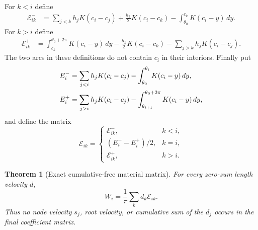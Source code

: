 \documentclass[11pt]{amsart}
\providecommand{\mathscr}{\mathcal}
\numberwithin{equation}{section}
\newtheorem{theorem}{Theorem}[section]
\theoremstyle{definition}
\theoremstyle{remark}
\providecommand{\mathscr}[1]{\mathcal{#1}}
\begin{document}
For $k<i$ define
\begin{align}
 \mathscr E_{ik}^-&=
 \sum_{j<k}h_jK(c_i-c_j)+\frac{h_k}{2}K(c_i-c_k)
 -\int_{\theta_0}^{c_k}K(c_i-y)\,dy. \label{F148:eq:Eminus}
\end{align}
For $k>i$ define
\begin{align}
 \mathscr E_{ik}^+&=
 \int_{c_k}^{\theta_0+2\pi}K(c_i-y)\,dy
 -\frac{h_k}{2}K(c_i-c_k)-\sum_{j>k}h_jK(c_i-c_j).
 \label{F148:eq:Eplus}
\end{align}
The two arcs in these definitions do not contain $c_i$ in their
interiors.  Finally put
\begin{align}
 E_i^-&=\sum_{j<i}h_jK(c_i-c_j)
       -\int_{\theta_0}^{\theta_i}K(c_i-y)\,dy,\notag\\
 E_i^+&=\sum_{j>i}h_jK(c_i-c_j)
       -\int_{\theta_{i+1}}^{\theta_0+2\pi}K(c_i-y)\,dy,
 \label{F148:eq:E-self}
\end{align}
and define the matrix
\begin{equation}\label{F148:eq:matrix}
 \mathscr E_{ik}=\begin{cases}
 \mathscr E_{ik}^-,&k<i,\\
 (E_i^--E_i^+)/2,&k=i,\\
 \mathscr E_{ik}^+,&k>i.
 \end{cases}
\end{equation}

\begin{theorem}[Exact cumulative-free material matrix]
\label{F148:thm:matrix}
For every zero-sum length velocity $d$,
\begin{equation}\label{F148:eq:W-matrix}
 \boxed{W_i=\frac1\pi\sum_k d_k\mathscr E_{ik}.}
\end{equation}
Thus no node velocity $s_j$, root velocity, or cumulative sum of the
$d_j$ occurs in the final coefficient matrix.
\end{theorem}
\end{document}
